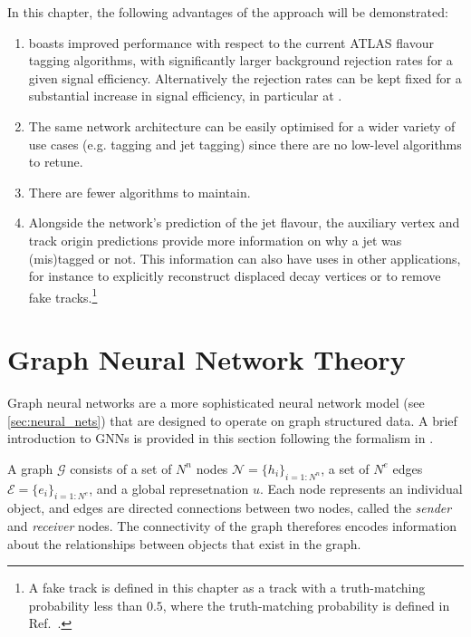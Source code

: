 In this chapter, the following advantages of the \GNN approach will be demonstrated:

\newcommand{\fakesfootnote}{%
A fake track is defined in this chapter as a track with a truth-matching probability less than $0.5$, where the truth-matching probability is defined in Ref.~\cite{PERF-2015-08}.
}
\begin{enumerate}
    \item \GNN boasts improved performance with respect to the current ATLAS flavour tagging algorithms, with significantly larger background rejection rates for a given signal efficiency. Alternatively the rejection rates can be kept fixed for a substantial increase in signal efficiency, in particular at \highpt.
    \item The same network architecture can be easily optimised for a wider variety of use cases (e.g. \cjet tagging and \highpt jet tagging) since there are no low-level algorithms to retune.
    \item There are fewer algorithms to maintain.
    \item Alongside the network's prediction of the jet flavour, the auxiliary vertex and track origin predictions provide more information on why a jet was (mis)tagged or not. This information can also have uses in other applications, for instance to explicitly reconstruct displaced decay vertices or to remove fake tracks.\footnote{\fakesfootnote}
\end{enumerate}


\section{Graph Neural Network Theory}\label{sec:gnn_theory}

Graph neural networks are a more sophisticated neural network model (see \cref{sec:neural_nets}) that are designed to operate on graph structured data.
A brief introduction to GNNs is provided in this section following the formalism in .

A graph $\mathcal{G}$ consists of a set of $N^n$ nodes $\mathcal{N} = \{h_i\}_{i=1:N^n}$, a set of $N^e$ edges $\mathcal{E} = \{e_i\}_{i=1:N^e}$, and a global represetnation $u$.
Each node represents an individual object, and edges are directed connections between two nodes, called the \textit{sender} and \textit{receiver} nodes.
The connectivity of the graph therefores encodes information about the relationships between objects that exist in the graph.

